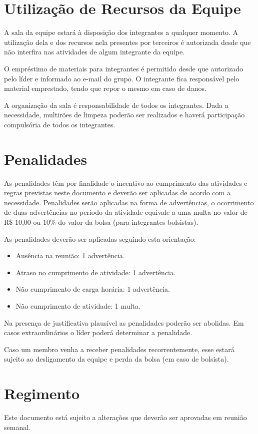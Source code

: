 \chapter{Utilização de Recursos da Equipe}
\label{chp:recursos}

A sala da equipe estará à disposição dos integrantes a qualquer momento. A utilização dela e dos recursos nela presentes por terceiros é autorizada desde que não interfira nas atividades de algum integrante da equipe.

O empréstimo de materiais para integrantes é permitido desde que autorizado pelo líder e informado ao e-mail do grupo. O integrante fica responsável pelo material emprestado, tendo que repor o mesmo em caso de danos.

A organização da sala é responsabilidade de todos os integrantes. Dada a necessidade, multirões de limpeza poderão ser realizados e haverá participação compulsória de todos os integrantes.

\chapter{Penalidades}
\label{chp:penalidades}
As penalidades têm por finalidade o incentivo ao cumprimento das atividades e regras previstas neste documento e deverão ser aplicadas de acordo com a necessidade. Penalidades serão aplicadas na forma de advertências, o ocorrimento de duas advertências  no período da atividade equivale a uma multa no valor de R\$ 10,00 ou 10\% do valor da bolsa (para integrantes bolsistas).

As penalidades deverão ser aplicadas seguindo esta orientação:
\begin{itemize}
\item[] Ausência na reunião: 1 advertência.
\item[] Atraso no cumprimento de atividade: 1 advertência.
\item[] Não cumprimento de carga horária: 1 advertência.
\item[] Não cumprimento de atividade: 1 multa.
\end{itemize}
Na presença de justificativa plausível as penalidades poderão ser abolidas. Em casos extraordinários o líder poderá determinar a penalidade.

Caso um membro venha a receber penalidades recorrentemente, esse estará sujeito ao desligamento da equipe e perda da bolsa (em caso de bolsista).


\chapter{Regimento}
\label{chp:regimento}

Este documento está sujeito a alterações que deverão ser aprovadas em reunião semanal.
